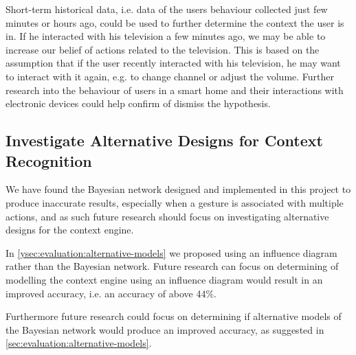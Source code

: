 Short-term historical data, i.e. data of the users behaviour collected just few minutes or hours ago, could be used to further determine the context the user is in. If he interacted with his television a few minutes ago, we may be able to increase our belief of actions related to the television. This is based on the assumption that if the user recently interacted with his television, he may want to interact with it again, e.g. to change channel or adjust the volume. Further research into the behaviour of users in a smart home and their interactions with electronic devices could help confirm of dismiss the hypothesis.

\subsection{Investigate Alternative Designs for Context Recognition}

We have found the Bayesian network designed and implemented in this project to produce inaccurate results, especially when a gesture is associated with multiple actions, and as such future research should focus on investigating alternative designs for the context engine.

In \cref{ysec:evaluation:alternative-models} we proposed using an influence diagram rather than the Bayesian network. Future research can focus on determining of modelling the context engine using an influence diagram would result in an improved accuracy, i.e. an accuracy of above 44\%.

Furthermore future research could focus on determining if alternative models of the Bayesian network would produce an improved accuracy, as suggested in \cref{sec:evaluation:alternative-models}.

